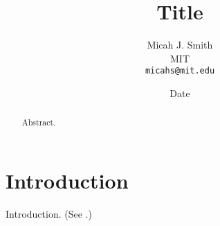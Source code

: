 \documentclass[conference,a4paper]{article}
\author{
    Micah J. Smith\\
    MIT\\
    \texttt{micahs@mit.edu}
}
\date{Date}
\title{Title}
\begin{document}
\maketitle

\begin{abstract}
    Abstract.
\end{abstract}

\section{Introduction}

Introduction. (See \cite{whitehead1912principia}.)



\end{document}
